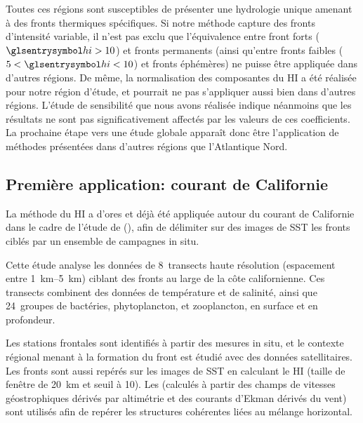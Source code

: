 Toutes ces régions sont susceptibles de présenter une hydrologie unique amenant à des fronts thermiques spécifiques.
Si notre méthode capture des fronts d'intensité variable, il n'est pas exclu que l'équivalence entre front forts (\(\am{hi}>10\)) et fronts permanents (ainsi qu'entre fronts faibles (\(5<\am{hi}<10\)) et fronts éphémères) ne puisse être appliquée dans d'autres régions.
De même, la normalisation des composantes du HI a été réalisée pour notre région d'étude, et pourrait ne pas s'appliquer aussi bien dans d'autres régions.
L'étude de sensibilité que nous avons réalisée indique néanmoins que les résultats  ne sont pas significativement affectés par les valeurs de ces coefficients.
La prochaine étape vers une étude globale apparaît donc être l'application de méthodes présentées dans d'autres régions que l'Atlantique Nord.

\subsection{Première application: courant de Californie}
\label{sec:cce}

La méthode du HI a d'ores et déjà été appliquée autour du courant de Californie dans le cadre de l'étude de \textcite{mangolte_2023} (), afin de délimiter sur des images de SST les fronts ciblés par un ensemble de campagnes in situ.

Cette étude analyse les données de 8~transects haute résolution (espacement entre \qtyrange[range-phrase={ et }]{1}{5}{\km}) ciblant des fronts au large de la côte californienne.
Ces transects combinent des données de température et de salinité, ainsi que 24~groupes de bactéries, phytoplancton, et zooplancton, en surface et en profondeur.

Les stations frontales sont identifiés à partir des mesures in situ, et le contexte régional menant à la formation du front est étudié avec des données satellitaires.
Les fronts sont aussi repérés sur les images de SST en calculant le HI (taille de fenêtre de \qty{20}{\km} et seuil à \num{10}).
Les   (calculés à partir des champs de vitesses géostrophiques dérivés par altimétrie et des courants d'Ekman dérivés du vent) sont utilisés afin de repérer les structures cohérentes liées au mélange horizontal.



